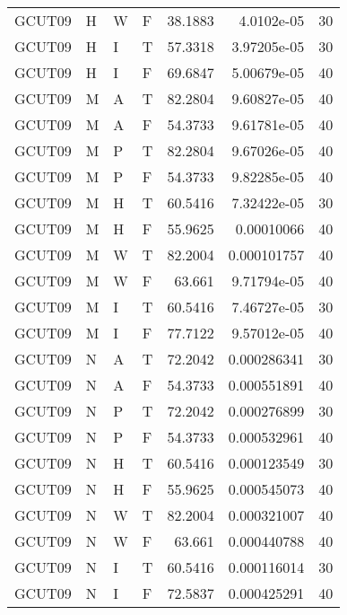 \begin{table}[htb!]
{\begin{tabular}{llllrrr}
            GCUT09   & H     & W     & F          & 38.1883    & 4.0102e-05  & 30       \\
            GCUT09   & H     & I     & T          & 57.3318    & 3.97205e-05 & 30       \\
            GCUT09   & H     & I     & F          & 69.6847    & 5.00679e-05 & 40       \\
            GCUT09   & M     & A     & T          & 82.2804    & 9.60827e-05 & 40       \\
            GCUT09   & M     & A     & F          & 54.3733    & 9.61781e-05 & 40       \\
            GCUT09   & M     & P     & T          & 82.2804    & 9.67026e-05 & 40       \\
            GCUT09   & M     & P     & F          & 54.3733    & 9.82285e-05 & 40       \\
            GCUT09   & M     & H     & T          & 60.5416    & 7.32422e-05 & 30       \\
            GCUT09   & M     & H     & F          & 55.9625    & 0.00010066  & 40       \\
            GCUT09   & M     & W     & T          & 82.2004    & 0.000101757 & 40       \\
            GCUT09   & M     & W     & F          & 63.661     & 9.71794e-05 & 40       \\
            GCUT09   & M     & I     & T          & 60.5416    & 7.46727e-05 & 30       \\
            GCUT09   & M     & I     & F          & 77.7122    & 9.57012e-05 & 40       \\
            GCUT09   & N     & A     & T          & 72.2042    & 0.000286341 & 30       \\
            GCUT09   & N     & A     & F          & 54.3733    & 0.000551891 & 40       \\
            GCUT09   & N     & P     & T          & 72.2042    & 0.000276899 & 30       \\
            GCUT09   & N     & P     & F          & 54.3733    & 0.000532961 & 40       \\
            GCUT09   & N     & H     & T          & 60.5416    & 0.000123549 & 30       \\
            GCUT09   & N     & H     & F          & 55.9625    & 0.000545073 & 40       \\
            GCUT09   & N     & W     & T          & 82.2004    & 0.000321007 & 40       \\
            GCUT09   & N     & W     & F          & 63.661     & 0.000440788 & 40       \\
            GCUT09   & N     & I     & T          & 60.5416    & 0.000116014 & 30       \\
            GCUT09   & N     & I     & F          & 72.5837    & 0.000425291 & 40       \\
            \hline
        \end{tabular}
    }{
    }
\end{table} 
